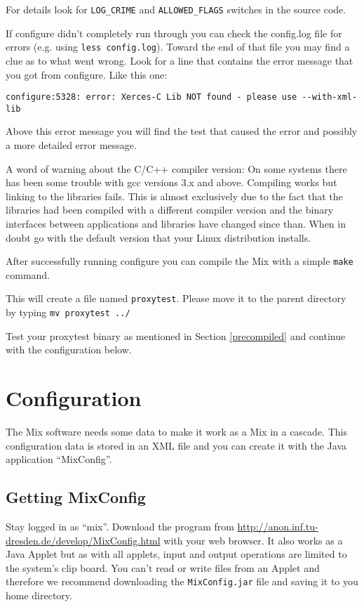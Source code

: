 \documentclass{article}
\begin{document}
For details look for \verb|LOG_CRIME| and \verb|ALLOWED_FLAGS|
switches in the source code.


If configure didn't completely run through you can check the config.log file for 
errors (e.g. using \verb|less config.log|). 
Toward the end of that file you may find a clue as to what went wrong. 
Look for a line that contains the error message that you got from configure. 
Like this one:
\begin{verbatim}
configure:5328: error: Xerces-C Lib NOT found - please use --with-xml-lib
\end{verbatim}
Above this error message you will find the test that caused the error and
possibly a more detailed error message.

A word of warning about the C/C++ compiler version: On some systems
there has been some trouble with gcc versions 3.x and above. Compiling
works but linking to the libraries fails. This is almost exclusively
due to the fact that the libraries had been compiled with a different
compiler version and the binary interfaces between applications and
libraries have changed since than. When in doubt go with the
default version that your Linux distribution installs.

After successfully running configure you can compile the Mix with a simple 
\verb|make| command.

This will create a file named \verb|proxytest|. Please move it to the
parent directory by typing \verb|mv proxytest ../|

Test your proxytest binary as mentioned in Section \ref{precompiled} and continue 
with the configuration below.


\section{Configuration} 


The Mix software needs some data to make it work as a Mix in a
cascade. This configuration data is stored in an XML file and you can
create it with the Java application ``MixConfig''.

\subsection{Getting MixConfig}

Stay logged in as ``mix''. Download the program from
\url{http://anon.inf.tu-dresden.de/develop/MixConfig.html} with your
web browser. It also works as a Java Applet but as with all applets,
input and output operations are limited to the system's clip board.
You can't read or write files from an Applet and therefore we recommend
downloading the \verb|MixConfig.jar| file and saving it to you home
directory.
\end{document}
